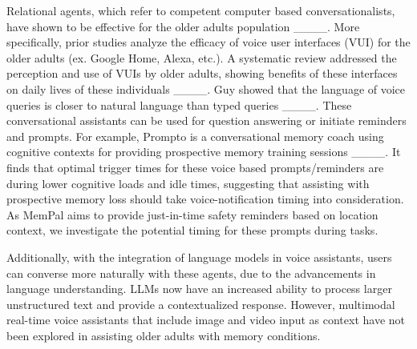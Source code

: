 Relational agents, which refer to competent computer based conversationalists, have shown to be effective for the older adults population ____. More specifically, prior studies analyze the efficacy of voice user interfaces (VUI) for the older adults (ex. Google Home, Alexa, etc.). A systematic review addressed the perception and use of VUIs by older adults, showing benefits of these interfaces on daily lives of these individuals ____. Guy showed that the language of voice queries is closer to natural language than typed queries ____. These conversational assistants can be used for question answering or initiate reminders and prompts. For example, Prompto is a conversational memory coach using cognitive contexts for providing prospective memory training sessions ____. It finds that optimal trigger times for these voice based prompts/reminders are during lower cognitive loads and idle times, suggesting that assisting with prospective memory loss should take voice-notification timing into consideration. As MemPal aims to provide just-in-time safety reminders based on location context, we investigate the potential timing for these prompts during tasks. 

Additionally, with the integration of language models in voice assistants, users can converse more naturally with these agents, due to the advancements in language understanding. LLMs now have an increased ability to process larger unstructured text and provide a contextualized response. However, multimodal real-time voice assistants that include image and video input as context have not been explored in assisting older adults with memory conditions.

\fi
